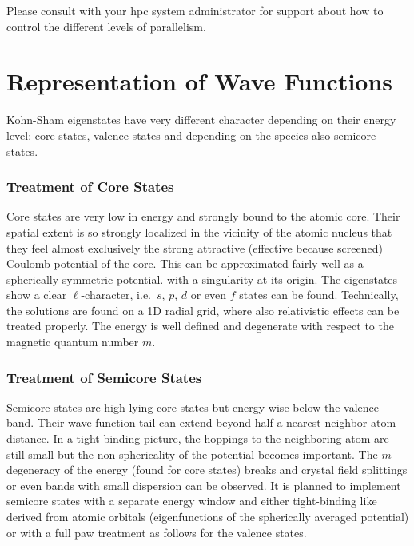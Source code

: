 \documentclass[oribibl]{llncs}
\begin{document}
Please consult with your \ac{hpc} system administrator for support
about how to control the different levels of parallelism.

\section{Representation of Wave Functions}

Kohn-Sham eigenstates have very different character depending on their energy level: core states, valence states and depending on the species also semicore states.
\subsubsection{Treatment of Core States}
Core states are very low in energy and strongly bound 
to the atomic core. 
Their spatial extent is so strongly localized 
in the vicinity of the atomic nucleus 
that they feel almost exclusively the strong attractive 
(effective because screened) Coulomb potential of the core. 
This can be approximated fairly well as a spherically symmetric potential.
with a singularity at its origin.
The eigenstates show a clear $\ell$-character, 
i.e.~$s$, $p$, $d$ or even $f$ states can be found.
Technically, the solutions are found on a 1D radial grid,
where also relativistic effects can be treated properly.
The energy is well defined and degenerate with respect to
the magnetic quantum number $m$.

\subsubsection{Treatment of Semicore States}
Semicore states are high-lying core states
but energy-wise below the valence band.
Their wave function tail can extend beyond half a nearest neighbor atom distance.
In a tight-binding picture, the hoppings to the neighboring atom are still small
but the non-sphericality of the potential becomes important.
The $m$-degeneracy of the energy (found for core states) breaks 
and crystal field splittings or even bands with small dispersion can be observed.
It is planned to implement semicore states with a separate energy window
and either tight-binding like derived from atomic orbitals 
(eigenfunctions of the spherically averaged potential) 
or with a full \ac{paw} treatment as follows for the valence states.
\end{document}
